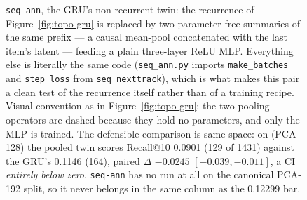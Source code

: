 \begin{figure}[ht]
  \caption{\texttt{seq-ann}, the GRU's non-recurrent twin: the recurrence of
    Figure~\ref{fig:topo-gru} is replaced by two parameter-free summaries of
    the same prefix --- a causal mean-pool concatenated with the last item's
    latent --- feeding a plain three-layer ReLU MLP. Everything else is
    literally the same code (\texttt{seq\_ann.py} imports
    \texttt{make\_batches} and \texttt{step\_loss} from
    \texttt{seq\_nexttrack}), which is what makes this pair a clean test of
    the recurrence itself rather than of a training recipe. Visual convention
    as in Figure~\ref{fig:topo-gru}: the two pooling operators are dashed
    because they hold no parameters, and only the MLP is trained. The
    defensible comparison is same-space: on 
    (PCA-128) the pooled twin scores Recall@10 \num{0.0901} (\num{129} of
    \num{1431}) against the GRU's \num{0.1146} (\num{164}), paired $\Delta$
    $-\num{0.0245}$ $[-0.039, -0.011]$, a CI \emph{entirely below zero}.
    \texttt{seq-ann} has no run at all on the canonical PCA-192 split, so it
    never belongs in the same column as the \num{0.12299} bar.}
  \label{fig:topo-ann}
\end{figure}


